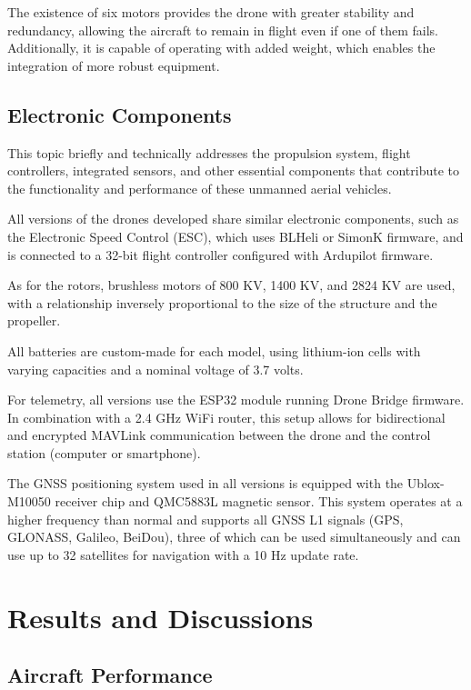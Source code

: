 \documentclass[conference]{IEEEtran}
\begin{document}
The existence of six motors provides the drone with greater stability and redundancy, allowing the aircraft to remain in flight even if one of them fails. Additionally, it is capable of operating with added weight, which enables the integration of more robust equipment.

\subsection{Electronic Components}

This topic briefly and technically addresses the propulsion system, flight controllers, integrated sensors, and other essential components that contribute to the functionality and performance of these unmanned aerial vehicles.

All versions of the drones developed share similar electronic components, such as the Electronic Speed Control (ESC), which uses BLHeli or SimonK firmware, and is connected to a 32-bit flight controller configured with Ardupilot firmware.

As for the rotors, brushless motors of 800 KV, 1400 KV, and 2824 KV are used, with a relationship inversely proportional to the size of the structure and the propeller.

All batteries are custom-made for each model, using lithium-ion cells with varying capacities and a nominal voltage of 3.7 volts.

For telemetry, all versions use the ESP32 module running Drone Bridge firmware. In combination with a 2.4 GHz WiFi router, this setup allows for bidirectional and encrypted MAVLink communication between the drone and the control station (computer or smartphone).

The GNSS positioning system used in all versions is equipped with the Ublox-M10050 receiver chip and QMC5883L magnetic sensor. This system operates at a higher frequency than normal and supports all GNSS L1 signals (GPS, GLONASS, Galileo, BeiDou), three of which can be used simultaneously and can use up to 32 satellites for navigation with a 10 Hz update rate.

\section{Results and Discussions}

\subsection{Aircraft Performance}
\end{document}
